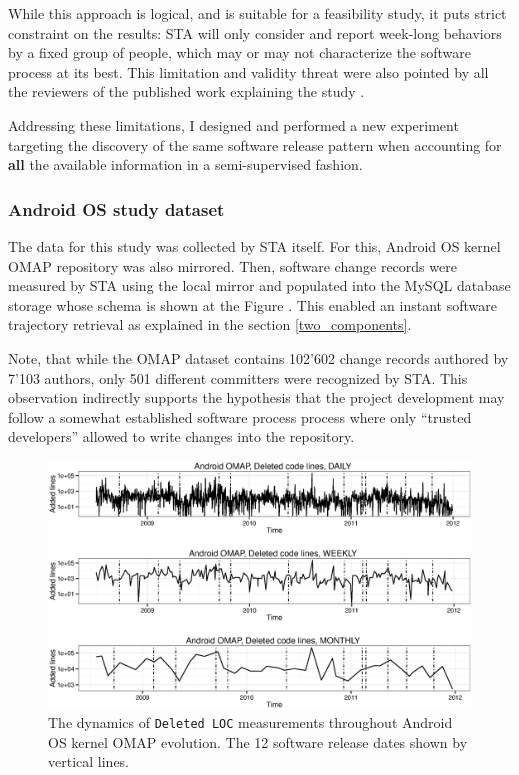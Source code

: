 While this approach is logical, and is suitable for a feasibility study, it puts strict constraint on the results: STA will only consider and report week-long behaviors by a fixed group of people, which may or may not characterize the software process at its best. This limitation and validity threat were also pointed by all the reviewers of the published work explaining the study \cite{csdl2-11-10}.

Addressing these limitations, I designed and performed a new experiment targeting the discovery of the same software release pattern when accounting for \textbf{all} the available information in a semi-supervised fashion.

\subsubsection{Android OS study dataset}
The data for this study was collected by STA itself. For this, Android OS kernel OMAP repository was also mirrored. Then, software change records were measured by STA using the local mirror and populated into the MySQL database storage whose schema is shown at the Figure \label{fig:STA12-schema}. This enabled an instant software trajectory retrieval as explained in the section \ref{two_components}.

Note, that while the OMAP dataset contains 102'602 change records authored by 7'103 authors, only 501 different committers were recognized by STA. This observation indirectly supports the hypothesis that the project development may follow a somewhat established software process process where only ``trusted developers'' allowed to write changes into the repository.

\begin{figure}[t]
   \centering
   \includegraphics[width=145mm]{figures/omap_removed_lines_plot.eps}
   \caption{The dynamics of \texttt{Deleted LOC} measurements throughout Android OS kernel OMAP evolution. 
   The 12 software release dates shown by vertical lines.}
   \label{fig:OMAP_dynamics}
\end{figure}

